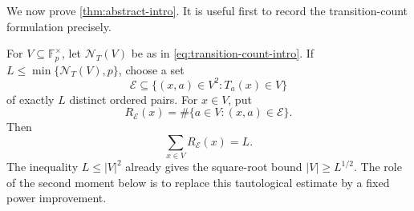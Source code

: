 \documentclass[11pt,reqno]{amsart}
\numberwithin{equation}{section}
\theoremstyle{definition}
\theoremstyle{remark}
\newcommand{\F}{\mathbb F}
\newcommand{\cE}{\mathcal E}
\newcommand{\cN}{\mathcal N}
\begin{document}
We now prove \cref{thm:abstract-intro}.  It is useful first to record the transition-count formulation precisely.

For $V\subseteq\F_p^\times$, let $\cN_T(V)$ be as in \eqref{eq:transition-count-intro}.  If $L\le\min\{\cN_T(V),p\}$, choose a set
\begin{equation}\label{eq:E-selected}
  \cE\subseteq\{(x,a)\in V^2:T_a(x)\in V\}
\end{equation}
of exactly $L$ distinct ordered pairs.  For $x\in V$, put
\begin{equation}\label{eq:R-E}
  R_{\cE}(x)=\#\{a\in V:(x,a)\in\cE\}.
\end{equation}
Then
\[
  \sum_{x\in V}R_{\cE}(x)=L.
\]
The inequality $L\le |V|^2$ already gives the square-root bound $|V|\ge L^{1/2}$.  The role of the second moment below is to replace this tautological estimate by a fixed power improvement.
\end{document}
